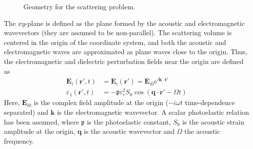 \documentclass[10pt,a4paper,draft]{scrartcl}
\begin{document}
\begin{figure}[h]
		\caption{\label{fig:radareq-geom} Geometry for the scattering problem.}
	\end{figure}
	The $xy$-plane is defined as the plane formed by the acoustic and electromagnetic wavevectors (they are assumed to be non-parallel). The scattering volume is centered in the origin of the coordinate system, and both the acoustic and electromagnetic waves are approximated as plane waves close to the origin. Thus, the electromagnetic and dielectric perturbation fields near the origin are defined as
	\begin{align*}
		\bm{E}_i (\bm{r}',t) &= \bm{E}_i (\bm{r}') = \bm{E}_{i0} e^{i\bm{k}\cdot\bm{r}'} \\
		\varepsilon_1 (\bm{r}',t) &= -\mathfrak{p} \varepsilon_r^2 S_0 \cos(\bm{q} \cdot \bm{r}' - \Omega t)
	\end{align*}
	Here, $\bm{E}_{i0}$ is the complex field amplitude at the origin ($-i\omega t$ time-dependence separated) and $\bm{k}$ is the electromagnetic wavevector. A scalar photoelastic relation has been assumed, where $\mathfrak{p}$ is the photoelastic constant, $S_0$ is the acoustic strain amplitude at the origin, $\bm{q}$ is the acoustic wavevector and $\Omega$ the acoustic frequency.
	
\end{document}
